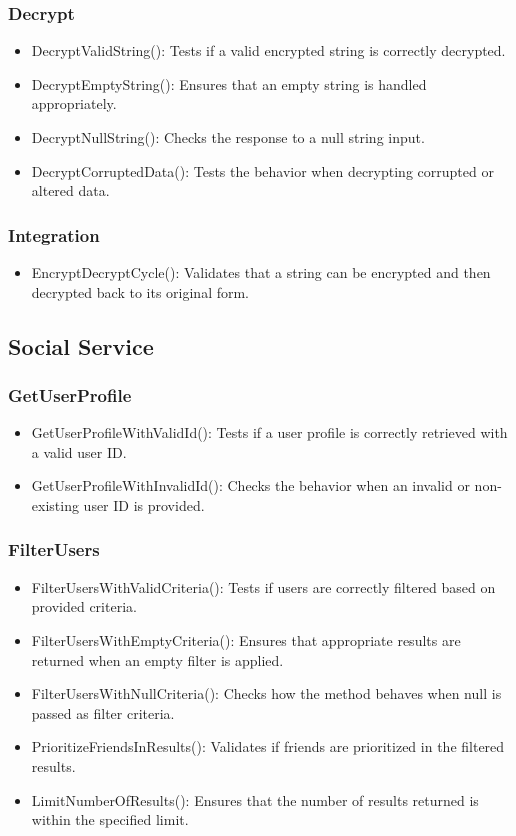 \documentclass[12pt, titlepage]{article}
\begin{document}
\subsubsection{Decrypt}
\begin{itemize}
    \item DecryptValidString(): Tests if a valid encrypted string is correctly decrypted.
    \item DecryptEmptyString(): Ensures that an empty string is handled appropriately.
    \item DecryptNullString(): Checks the response to a null string input.
    \item DecryptCorruptedData(): Tests the behavior when decrypting corrupted or altered data.
\end{itemize}
\subsubsection{Integration}
\begin{itemize}
    \item EncryptDecryptCycle(): Validates that a string can be encrypted and then decrypted back to its original form.
\end{itemize}

\subsection{Social Service}
\subsubsection{GetUserProfile}
\begin{itemize}
    \item GetUserProfileWithValidId(): Tests if a user profile is correctly retrieved with a valid user ID.
    \item GetUserProfileWithInvalidId(): Checks the behavior when an invalid or non-existing user ID is provided.
\end{itemize}
\subsubsection{FilterUsers}
\begin{itemize}
    \item FilterUsersWithValidCriteria(): Tests if users are correctly filtered based on provided criteria.
    \item FilterUsersWithEmptyCriteria(): Ensures that appropriate results are returned when an empty filter is applied.
    \item FilterUsersWithNullCriteria(): Checks how the method behaves when null is passed as filter criteria.
    \item PrioritizeFriendsInResults(): Validates if friends are prioritized in the filtered results.
    \item LimitNumberOfResults(): Ensures that the number of results returned is within the specified limit.
\end{itemize}
\end{document}
